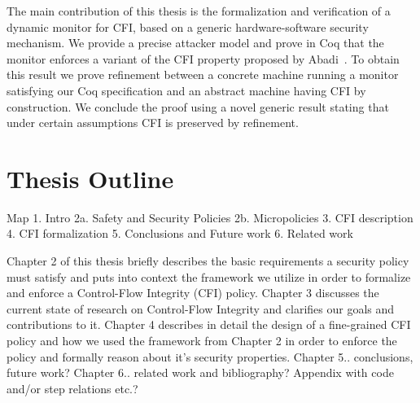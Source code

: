 The main contribution of this thesis is the formalization and
verification of a dynamic monitor for CFI, based on a generic
hardware-software security mechanism.
%
We provide a precise attacker model and prove in Coq that the monitor
enforces a variant of the CFI property proposed by
Abadi~\ETAL\cite{abadi2005}.
%
To obtain this result we prove refinement between a concrete
machine running a monitor satisfying our Coq specification
and an abstract machine having CFI by construction.
%
We conclude the proof using a novel generic result stating that under
certain assumptions CFI is preserved by refinement.

\section{Thesis Outline}\label{sec:outline}
Map
1. Intro
2a. Safety and Security Policies
2b. Micropolicies
3. CFI description
4. CFI formalization
5. Conclusions and Future work
6. Related work

Chapter 2 of this thesis briefly describes the basic requirements a security
policy must satisfy and puts into context the framework we utilize in order
to formalize and enforce a Control-Flow Integrity (CFI) policy.
Chapter 3 discusses the current state of research on Control-Flow Integrity 
and clarifies our goals and contributions to it.
Chapter 4 describes in detail the design of a fine-grained CFI policy and
how we used the framework from Chapter 2 in order to enforce the policy
and formally reason about it's security properties.
Chapter 5.. conclusions, future work?
Chapter 6.. related work and bibliography?
Appendix with code and/or step relations etc.?
